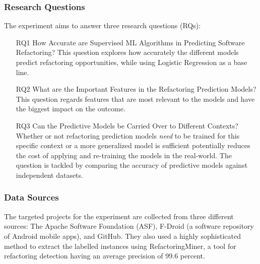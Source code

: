 \subsubsection{Research Questions}
The experiment aims to answer three research questions (RQs): 
\begin{itemize}
    \item[RQ1] How Accurate are Supervised ML Algorithms in Predicting Software Refactoring? This question explores how accurately the different models predict refactoring opportunities, while using Logistic Regression as a base line.
    \item[RQ2] What are the Important Features in the Refactoring Prediction Models? This question regards features that are most relevant to the models and have the biggest impact on the outcome.
    \item[RQ3] Can the Predictive Models be Carried Over to Different Contexts? Whether or not refactoring prediction models \textit{need} to be trained for this specific context or a more generalized model is sufficient potentially reduces the cost of applying and re-training the models in the real-world. The question is tackled by comparing the accuracy of predictive models against independent datasets.
\end{itemize}
\subsubsection{Data Sources}
The targeted projects for the experiment are collected from three different sources: The Apache Software Foundation (ASF), F-Droid (a software repository of Android mobile apps), and GitHub. They also used a highly sophisticated method to extract the labelled instances using RefactoringMiner\cite{tsantalis2018accurate}, a tool for refactoring detection having an average precision of 99.6 percent\cite{tsantalis2022refactoringminer}.
